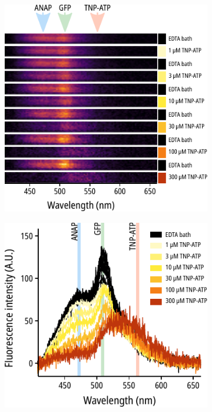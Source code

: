 \begin{figure}[hbtp]
\begin{subfigure}[t]{0.3\textwidth}
	\end{subfigure}
	\hfill
	\begin{subfigure}[t]{0.6\textwidth}
		\caption{}\label{ch3fig:unroofed_spectral_images}
		\centering
		\includegraphics[width=\textwidth]{unroofed_spectral_images.pdf}
	\end{subfigure}
	\vfill
	\begin{subfigure}[t]{0.45\textwidth}
		\caption{}\label{ch3fig:unroofed_spectral_traces}
		\centering
		\includegraphics[width=\textwidth]{unroofed_spectral_traces.pdf}

\end{subfigure}
\end{figure}

